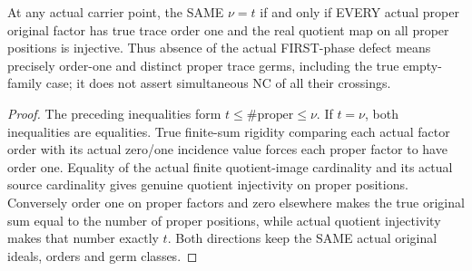 \begin{theorem}
\label{hir:sharp-original-distinct-defect-exact-equality-recognition}
\leanok
At any actual carrier point, the SAME $\nu=t$ if and only if EVERY actual proper
original factor has true trace order one and the real quotient map on all
proper positions is injective. Thus absence of the actual FIRST-phase defect
means precisely order-one and distinct proper trace germs, including the true
empty-family case; it does not assert simultaneous NC of all their crossings.
\end{theorem}
\begin{proof}
The preceding inequalities form $t\leq\#\mathrm{proper}\leq\nu$. If $t=\nu$,
both inequalities are equalities. True finite-sum rigidity comparing each
actual factor order with its actual zero/one incidence value forces each proper
factor to have order one. Equality of the actual finite quotient-image
cardinality and its actual source cardinality gives genuine quotient
injectivity on proper positions. Conversely order one on proper factors and
zero elsewhere makes the true original sum equal to the number of proper
positions, while actual quotient injectivity makes that number exactly $t$.
Both directions keep the SAME actual original ideals, orders and germ classes.
\end{proof}

